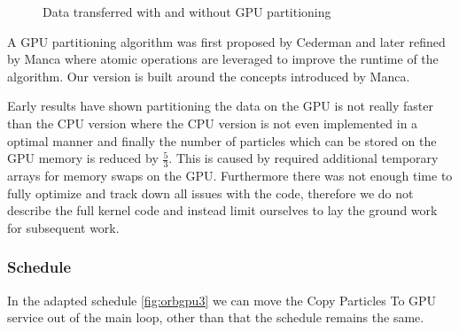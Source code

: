 \documentclass[]{article}
\begin{document}
\begin{figure}[H]
	\begin{center}
		\caption{Data transferred with and without GPU partitioning}
		\label{fig:transfer}
	\end{center}
\end{figure}


A GPU partitioning algorithm was first proposed by Cederman \cite{GPUQ} and later refined by Manca \cite{CUDAQ} where atomic operations are leveraged to improve the runtime of the algorithm. Our version is built around the concepts introduced by Manca. 

Early results have shown partitioning the data on the GPU is not really faster than the CPU version where the CPU version is not even implemented in a optimal manner and finally the number of particles which can be stored on the GPU memory is reduced by $\frac{5}{3}$. This is caused by required additional temporary arrays for memory swaps on the GPU. Furthermore there was not enough time to fully optimize and track down all issues with the code, therefore we do not describe the full kernel code and instead limit ourselves to lay the ground work for subsequent work. 

\subsubsection{Schedule}

In the adapted schedule \ref{fig:orbgpu3} we can move the Copy Particles To GPU service out of the main loop, other than that the schedule remains the same. 
\end{document}

